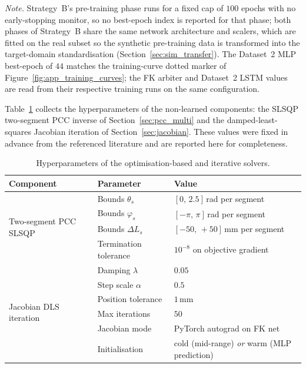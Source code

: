 \begin{table}[!htbp]
  \vspace{0.5em}
  \noindent\emph{Note.} Strategy~B's pre-training phase runs for a fixed cap of $100$ epochs with no early-stopping monitor, so no best-epoch index is reported for that phase; both phases of Strategy~B share the same network architecture and scalers, which are fitted on the real subset so the synthetic pre-training data is transformed into the target-domain standardisation (Section~\ref{sec:sim_transfer}). The Dataset~2 MLP best-epoch of $44$ matches the training-curve dotted marker of Figure~\ref{fig:app_training_curves}; the FK arbiter and Dataset~2 LSTM values are read from their respective training runs on the same configuration.
\end{table}

Table~\ref{tab:app_hyperparams_solvers} collects the hyperparameters of the non-learned components: the SLSQP two-segment PCC inverse of Section~\ref{sec:pcc_multi} and the damped-least-squares Jacobian iteration of Section~\ref{sec:jacobian}. These values were fixed in advance from the referenced literature and are reported here for completeness.

\begin{table}[!htbp]
  \centering
  \small
  \caption{Hyperparameters of the optimisation-based and iterative solvers.}
  \label{tab:app_hyperparams_solvers}
  \begin{tabularx}{\linewidth}{@{}l l X@{}}
    \toprule
    Component & Parameter & Value \\
    \midrule
    \multirow{4}{*}{Two-segment PCC SLSQP} & Bounds $\theta_{s}$            & $[0,\, 2.5]$\,rad per segment \\
                                            & Bounds $\varphi_{s}$           & $[-\pi,\, \pi]$\,rad per segment \\
                                            & Bounds $\Delta L_{s}$          & $[-50,\, +50]$\,mm per segment \\
                                            & Termination tolerance          & $10^{-8}$ on objective gradient \\
    \midrule
    \multirow{6}{*}{Jacobian DLS iteration} & Damping $\lambda$              & $0.05$ \\
                                            & Step scale $\alpha$            & $0.5$ \\
                                            & Position tolerance             & $1$\,mm \\
                                            & Max iterations                 & $50$ \\
                                            & Jacobian mode                  & PyTorch autograd on FK net \\
                                            & Initialisation                 & cold (mid-range) \textit{or} warm (MLP prediction) \\
    \bottomrule
  \end{tabularx}
\end{table}

